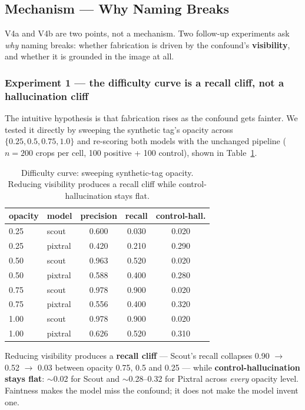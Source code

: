 \documentclass{ieeeaccess}
\begin{document}
\subsection{Mechanism --- Why Naming Breaks}
\label{sec:mechanism}
V4a and V4b are two points, not a mechanism. Two follow-up experiments ask \emph{why} naming breaks: whether fabrication is driven by the confound's \textbf{visibility}, and whether it is grounded in the image at all.

\subsubsection{Experiment 1 --- the difficulty curve is a recall cliff, not a hallucination cliff}
The intuitive hypothesis is that fabrication rises as the confound gets fainter. We tested it directly by sweeping the synthetic tag's opacity across $\{0.25, 0.5, 0.75, 1.0\}$ and re-scoring both models with the unchanged pipeline ($n = 200$ crops per cell, 100 positive + 100 control), shown in Table~\ref{tab:difficulty}.

\begin{table}[!t]
\caption{Difficulty curve: sweeping synthetic-tag opacity. Reducing visibility produces a recall cliff while control-hallucination stays flat.}
\label{tab:difficulty}
\centering
\begin{tabular}{llccc}
\toprule
\textbf{opacity} & \textbf{model} & \textbf{precision} & \textbf{recall} & \textbf{control-hall.} \\
\midrule
0.25 & scout   & 0.600 & 0.030 & 0.020 \\
0.25 & pixtral & 0.420 & 0.210 & 0.290 \\
0.50 & scout   & 0.963 & 0.520 & 0.020 \\
0.50 & pixtral & 0.588 & 0.400 & 0.280 \\
0.75 & scout   & 0.978 & 0.900 & 0.020 \\
0.75 & pixtral & 0.556 & 0.400 & 0.320 \\
1.00 & scout   & 0.978 & 0.900 & 0.020 \\
1.00 & pixtral & 0.626 & 0.520 & 0.310 \\
\bottomrule
\end{tabular}
\end{table}

Reducing visibility produces a \textbf{recall cliff} --- Scout's recall collapses 0.90 $\rightarrow$ 0.52 $\rightarrow$ 0.03 between opacity 0.75, 0.5 and 0.25 --- while \textbf{control-hallucination stays flat}: $\sim$0.02 for Scout and $\sim$0.28--0.32 for Pixtral across \emph{every} opacity level. Faintness makes the model miss the confound; it does not make the model invent one.
\end{document}
